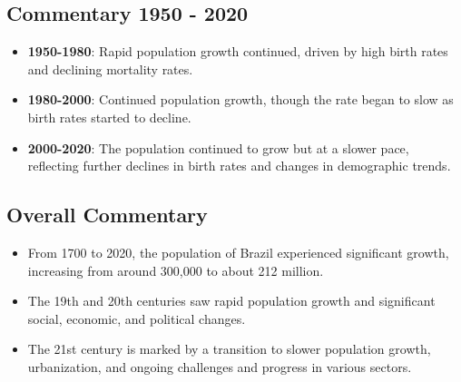 \subsection*{Commentary 1950 - 2020}
\begin{itemize}
    \item \textbf{1950-1980}: Rapid population growth continued, driven by high birth rates and declining mortality rates.
    \item \textbf{1980-2000}: Continued population growth, though the rate began to slow as birth rates started to decline.
    \item \textbf{2000-2020}: The population continued to grow but at a slower pace, reflecting further declines in birth rates and changes in demographic trends.
\end{itemize}

\subsection*{Overall Commentary}
\begin{itemize}
    \item From 1700 to 2020, the population of Brazil experienced significant growth, increasing from around 300,000 to about 212 million.
    \item The 19th and 20th centuries saw rapid population growth and significant social, economic, and political changes.
    \item The 21st century is marked by a transition to slower population growth, urbanization, and ongoing challenges and progress in various sectors.
\end{itemize}